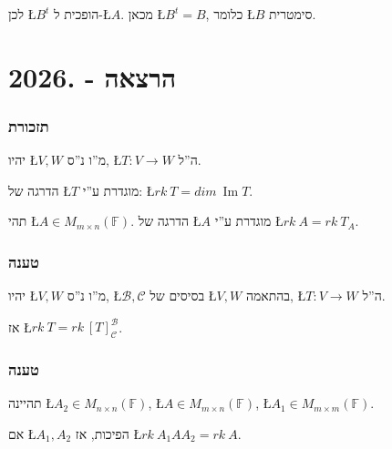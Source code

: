 \documentclass[english,hebrew]{article}
\begin{document}
לכן \L{$B^{t}$} הופכית ל-\L{$A$}. מכאן \L{$B^{t}=B$}, כלומר \L{$B$}
סימטרית.

\newpage{}

\noindent{}

\part{הרצאה {\endL} - {.2026\endL}}

\section{תזכורת}

יהיו \L{$V,W$} מ\textquotedblright ו נ\textquotedblright ס, \L{$T:V\rightarrow W$}
ה\textquotedblright ל.

הדרגה של \L{$T$} מוגדרת ע\textquotedblright י: \L{$rk\:T=dim\:\operatorname{Im}T$}.

תהי \L{$A\in M_{m\times n}(\mathbb{F})$}. הדרגה של \L{$A$} מוגדרת
ע\textquotedblright י \L{$rk\:A=rk\:T_{A}$}.

\section{טענה}

יהיו \L{$V,W$} מ\textquotedblright ו נ\textquotedblright ס, \L{$\mathcal{B},\mathcal{C}$}
בסיסים של \L{$V,W$} בהתאמה, \L{$T:V\rightarrow W$} ה\textquotedblright ל.

אז \L{$rk\:T=rk\:[T]_{\mathcal{C}}^{\mathcal{B}}$}.

\section{טענה}

תהיינה \L{$A_{2}\in M_{n\times n}(\mathbb{F})$}, \L{$A\in M_{m\times n}(\mathbb{F})$},
\L{$A_{1}\in M_{m\times m}(\mathbb{F})$}.

אם \L{$A_{1},A_{2}$} הפיכות, אז \L{$rk\:A_{1}AA_{2}=rk\:A$}.
\end{document}
